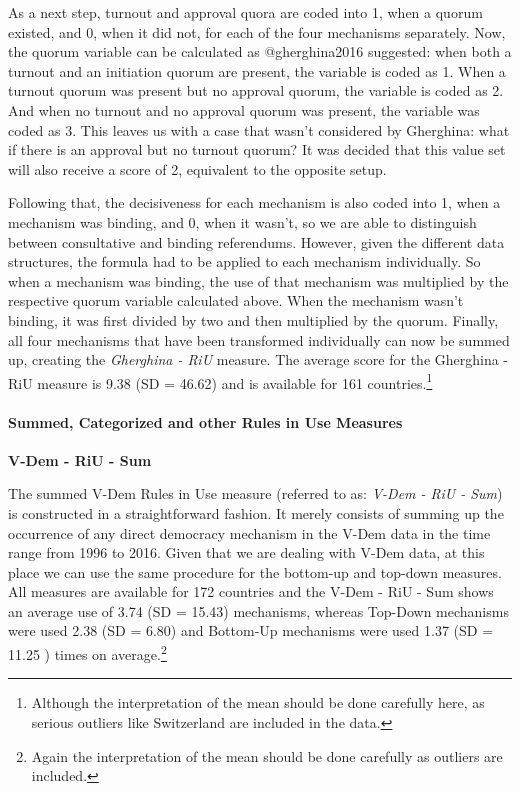 \documentclass[]{article}
\let\oldparagraph\paragraph
\renewcommand{\paragraph}[1]{\oldparagraph{#1}\mbox{}}
\let\rmarkdownfootnote\footnote%
\def\footnote{\protect\rmarkdownfootnote}
\begin{document}
As a next step, turnout and approval quora are coded into 1, when a
quorum existed, and 0, when it did not, for each of the four mechanisms
separately. Now, the quorum variable can be calculated as @gherghina2016
suggested: when both a turnout and an initiation quorum are present, the
variable is coded as 1. When a turnout quorum was present but no
approval quorum, the variable is coded as 2. And when no turnout and no
approval quorum was present, the variable was coded as 3. This leaves us
with a case that wasn't considered by Gherghina: what if there is an
approval but no turnout quorum? It was decided that this value set will
also receive a score of 2, equivalent to the opposite setup.

Following that, the decisiveness for each mechanism is also coded into
1, when a mechanism was binding, and 0, when it wasn't, so we are able
to distinguish between consultative and binding referendums. However,
given the different data structures, the formula had to be applied to
each mechanism individually. So when a mechanism was binding, the use of
that mechanism was multiplied by the respective quorum variable
calculated above. When the mechanism wasn't binding, it was first
divided by two and then multiplied by the quorum. Finally, all four
mechanisms that have been transformed individually can now be summed up,
creating the \emph{Gherghina - RiU} measure. The average score for the
Gherghina - RiU measure is 9.38 (SD = 46.62) and is available for 161
countries.\footnote{Although the interpretation of the mean should be
  done carefully here, as serious outliers like Switzerland are included
  in the data.}

\paragraph{Summed, Categorized and other Rules in Use
Measures}\label{summed-categorized-and-other-rules-in-use-measures}

\textbf{V-Dem - RiU - Sum}

The summed V-Dem Rules in Use measure (referred to as: \emph{V-Dem - RiU
- Sum}) is constructed in a straightforward fashion. It merely consists
of summing up the occurrence of any direct democracy mechanism in the
V-Dem data in the time range from 1996 to 2016. Given that we are
dealing with V-Dem data, at this place we can use the same procedure for
the bottom-up and top-down measures. All measures are available for 172
countries and the V-Dem - RiU - Sum shows an average use of 3.74 (SD =
15.43) mechanisms, whereas Top-Down mechanisms were used 2.38 (SD =
6.80) and Bottom-Up mechanisms were used 1.37 (SD = 11.25 ) times on
average.\footnote{Again the interpretation of the mean should be done
  carefully as outliers are included.}
\end{document}
